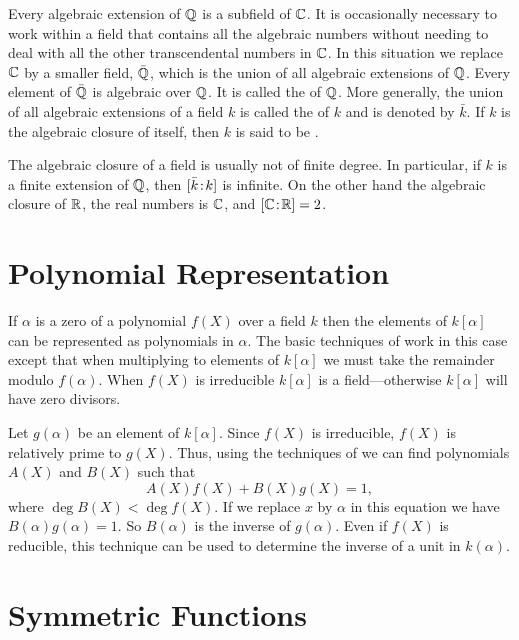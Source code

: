 \smallskip
Every algebraic extension of $\mathbb{Q}$ is a subfield of $\mathbb{C}$.  It is
occasionally necessary to work within a field that contains all the
algebraic numbers without needing to deal with all the other transcendental
numbers in $\mathbb{C}$.  In this situation we replace $\mathbb{C}$ by a smaller field,
$\bar{\mathbb{Q}}$, which is the union of all algebraic extensions of $\mathbb{Q}$.  Every
element of $\bar{\mathbb{Q}}$ is algebraic over $\mathbb{Q}$.  It is called the
 of $\mathbb{Q}$.  More generally, the union of all
algebraic extensions of a field $k$ is called the 
of $k$ and is denoted by $\bar{k}$.  If $k$ is the algebraic closure of
itself, then $k$ is said to be .

The algebraic closure of a field is usually not of finite degree.  In
particular, if $k$ is a finite extension of $\mathbb{Q}$, then
$[\bar{k}\!:\!k]$ is infinite.  On the other hand the algebraic
closure of $\mathbb{R}$, the real numbers is $\mathbb{C}$, and $[\mathbb{C}\!:\!\mathbb{R}]=2$.

\section{Polynomial Representation}
\label{Algebraic:Polynomial:Sec}

If $\alpha$ is a zero of a polynomial $f(X)$ over a field $k$ then the
elements of $k[\alpha]$ can be represented as polynomials in $\alpha$.  The
basic techniques of  work in this case except that
when multiplying to elements of $k[\alpha]$ we must take the remainder
modulo $f(\alpha)$.  When $f(X)$ is irreducible $k[\alpha]$ is a
field---otherwise $k[\alpha]$ will have zero divisors.

Let $g(\alpha)$ be an element of $k[\alpha]$.  Since $f(X)$ is
irreducible, $f(X)$ is relatively prime to $g(X)$.  Thus, using the
techniques of  we can find polynomials $A(X)$ and
$B(X)$ such that
\[
A(X) f(X) + B(X) g(X) = 1,
\]
where $\deg B(X) < \deg f(X)$.  If we replace $x$ by $\alpha$ in this
equation we have $B(\alpha) g(\alpha) = 1$.  So $B(\alpha)$ is the inverse
of $g(\alpha)$.  Even if $f(X)$ is reducible, this technique can be used to
determine the inverse of a unit in $k(\alpha)$.

\section{Symmetric Functions}
\label{Symmetric:Sec}


